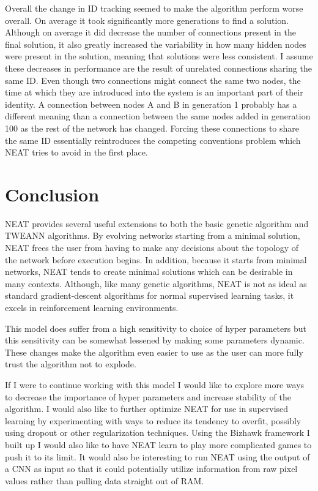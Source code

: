 \documentclass[twocolumn,letterpaper]{article}
\begin{document}
Overall the change in ID tracking seemed to make the algorithm perform worse overall. On average it took significantly more generations to find a solution. Although on average it did decrease the number of
connections present in the final solution, it also greatly increased the variability in how many hidden
nodes were present in the solution, meaning that solutions were less consistent. I assume these decreases in performance are the result of unrelated connections sharing the same ID. Even though two connections might
connect the same two nodes, the time at which they are introduced into the system is an important part of
their identity. A connection between nodes A and B in generation 1 probably has a different meaning than a
connection between the same nodes added in generation 100 as the rest of the network has changed. Forcing
these connections to share the same ID essentially reintroduces the competing conventions problem which NEAT
tries to avoid in the first place.

\section{Conclusion} \label{sec:conclusion}
NEAT provides several useful extensions to both the basic genetic algorithm and TWEANN algorithms. By 
evolving networks starting from a minimal solution, NEAT frees the user from having to make any decisions 
about the topology of the network before execution begins. In addition, because it starts from minimal networks, NEAT tends to create minimal solutions which can be desirable in many contexts. Although, like many genetic algorithms, NEAT is not as ideal as standard gradient-descent algorithms for
normal supervised learning tasks, it excels in reinforcement learning environments.

This model does suffer from a high sensitivity to choice of hyper parameters but this sensitivity can be
somewhat lessened by making some parameters dynamic. These changes make the algorithm even easier to use as
the user can more fully trust the algorithm not to explode.

If I were to continue working with this model I would like to explore more ways to decrease the
importance of hyper parameters and increase stability of the algorithm. I would also like to further optimize NEAT for use in
supervised learning by experimenting with ways to reduce its tendency to overfit, possibly using dropout or
other regularization techniques. Using the Bizhawk framework I built up I would also like to have NEAT learn to play more complicated games to push it to its limit. It would also be interesting to run NEAT
using the output of a CNN as input so that it could potentially utilize information from raw pixel values
rather than pulling data straight out of RAM.

\medskip


\end{document}
